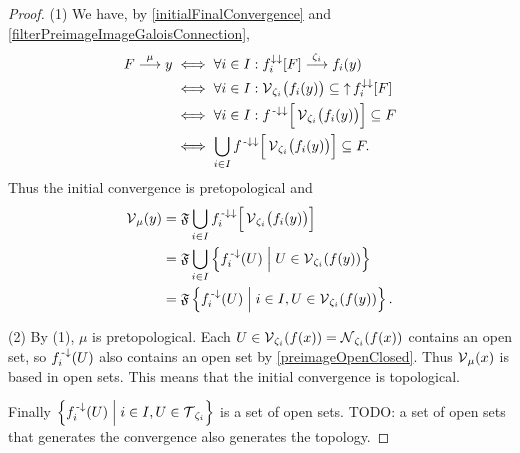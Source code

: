 \begin{proof}
(1) We have, by \ref{initialFinalConvergence} and \ref{filterPreimageImageGaloisConnection},
\begin{align*}
F \overset{\mu}{\longrightarrow} y &\iff \forall i\in I: f_i^{\downarrow\downarrow}[F] \overset{\zeta_i}{\longrightarrow} f_i(y) \\
&\iff \forall i\in I: \operatorname{\mathcal{V}}_{\zeta_i}\!\big(f_i(y)\big) \subseteq \operatorname{\uparrow} f_i^{\downarrow\downarrow}[F] \\
&\iff \forall i\in I: f^{{\text{\hspace{0.15em}-}\downarrow}\downarrow}\Big[\operatorname{\mathcal{V}}_{\zeta_i}\!\big(f_i(y)\big)\Big] \subseteq F \\
&\iff \bigcup_{i\in I} f^{{\text{\hspace{0.15em}-}\downarrow}\downarrow}\Big[\operatorname{\mathcal{V}}_{\zeta_i}\!\big(f_i(y)\big)\Big] \subseteq F.
\end{align*}
Thus the initial convergence is pretopological and
\begin{align*}
\operatorname{\mathcal{V}}_\mu(y) &= \mathfrak{F}\bigcup_{i\in I} f_i^{{\text{\hspace{0.15em}-}\downarrow}\downarrow}\Big[\operatorname{\mathcal{V}}_{\zeta_i}\!\big(f_i(y)\big)\Big] \\
&= \mathfrak{F}\bigcup_{i\in I}\left\{ f_i^{\text{\hspace{0.15em}-}\downarrow}(U) \;\middle|\; U\in \operatorname{\mathcal{V}}_{\zeta_i}(f(y)) \right\} \\
&= \mathfrak{F}\left\{ f_i^{\text{\hspace{0.15em}-}\downarrow}(U) \;\middle|\; i\in I, U\in \operatorname{\mathcal{V}}_{\zeta_i}(f(y)) \right\}.
\end{align*}

(2) By (1), $\mu$ is pretopological. Each $U\in \operatorname{\mathcal{V}}_{\zeta_i}(f(x)) = \operatorname{\mathcal{N}}_{\zeta_i}(f(x))$ contains an open set, so $f_i^{\text{\hspace{0.15em}-}\downarrow}(U)$ also contains an open set by \ref{preimageOpenClosed}. Thus $\operatorname{\mathcal{V}}_\mu(x)$ is based in open sets. This means that the initial convergence is topological.

Finally $\left\{ f_i^{\text{\hspace{0.15em}-}\downarrow}(U) \;\middle|\; i\in I, U\in \operatorname{\mathcal{T}}_{\zeta_i} \right\}$ is a set of open sets. TODO: a set of open sets that generates the convergence also generates the topology.
\end{proof}


